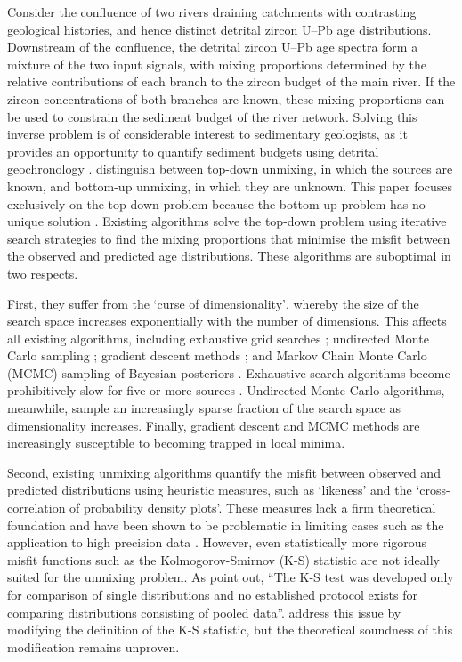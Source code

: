 \documentclass{article}
\begin{document}
Consider the confluence of two rivers draining catchments with
contrasting geological histories, and hence distinct detrital zircon
U--Pb age distributions. Downstream of the confluence, the detrital
zircon U--Pb age spectra form a mixture of the two input signals, with
mixing proportions determined by the relative contributions of each
branch to the zircon budget of the main river. If the zircon
concentrations of both branches are known, these mixing proportions
can be used to constrain the sediment budget of the river
network. Solving this inverse problem is of considerable interest to
sedimentary geologists, as it provides an opportunity to quantify
sediment budgets using detrital geochronology \citep{amidon2005,
  kimbrough2015, sharman2017, sundell2017, malkowski2019,
  tipton2022}. \citet{sharman2017} distinguish between top-down
unmixing, in which the sources are known, and bottom-up unmixing, in
which they are unknown. This paper focuses exclusively on the top-down
problem because the bottom-up problem has no unique solution
\citep{saylor2019}. Existing algorithms solve the top-down problem
using iterative search strategies to find the mixing proportions that
minimise the misfit between the observed and predicted age
distributions. These algorithms are suboptimal in two
respects.\medskip

First, they suffer from the `curse of dimensionality', whereby the
size of the search space increases exponentially with the number of
dimensions. This affects all existing algorithms, including exhaustive
grid searches \citep{sharman2017}; undirected Monte Carlo sampling
\citep{sundell2017}; gradient descent methods \citep[as implemented in
  recent versions of \texttt{detritalPy},][]{sharman2018}; and Markov
Chain Monte Carlo (MCMC) sampling of Bayesian posteriors
\citep{tipton2022}. Exhaustive search algorithms become prohibitively
slow for five or more sources \citep{sundell2017}. Undirected Monte
Carlo algorithms, meanwhile, sample an increasingly sparse fraction of
the search space as dimensionality increases. Finally, gradient
descent and MCMC methods are increasingly susceptible to becoming
trapped in local minima.\medskip

Second, existing unmixing algorithms quantify the misfit between
observed and predicted distributions using heuristic measures, such as
`likeness' and the `cross-correlation of probability density
plots'. These measures lack a firm theoretical foundation and have
been shown to be problematic in limiting cases such as the application
to high precision data \citep{vermeesch2018b}. However, even
statistically more rigorous misfit functions such as the
Kolmogorov-Smirnov (K-S) statistic are not ideally suited for the
unmixing problem. As \citet{kimbrough2015} point out, ``The K-S test
was developed only for comparison of single distributions and no
established protocol exists for comparing distributions consisting of
pooled data''. \citet{kimbrough2015} address this issue by modifying
the definition of the K-S statistic, but the theoretical soundness of
this modification remains unproven.
\medskip
\end{document}
